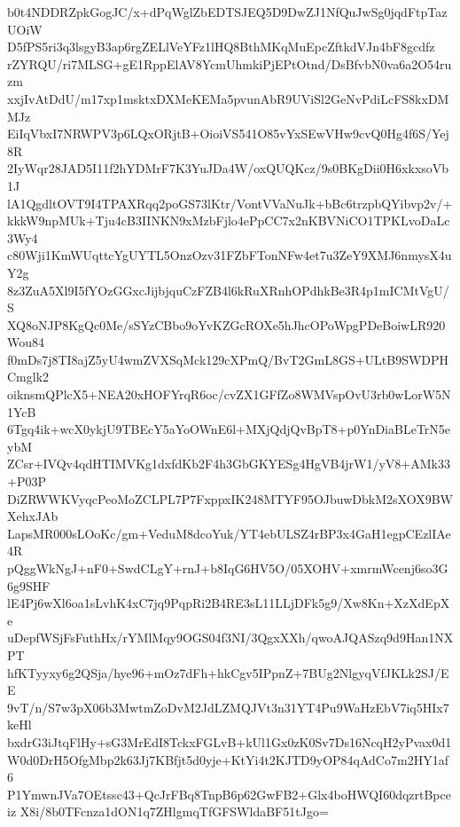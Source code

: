 b0t4NDDRZpkGogJC/x+dPqWglZbEDTSJEQ5D9DwZJ1NfQuJwSg0jqdFtpTazUOiW
D5fPS5ri3q3lsgyB3ap6rgZELlVeYFz1lHQ8BthMKqMuEpcZftkdVJn4bF8gcdfz
rZYRQU/ri7MLSG+gE1RppElAV8YcmUhmkiPjEPtOtnd/DsBfvbN0va6a2O54ruzm
xxjIvAtDdU/m17xp1msktxDXMeKEMa5pvunAbR9UViSl2GeNvPdiLcFS8kxDMMJz
EiIqVbxI7NRWPV3p6LQxORjtB+OioiVS541O85vYxSEwVHw9cvQ0Hg4f6S/Yej8R
2IyWqr28JAD5I11f2hYDMrF7K3YuJDa4W/oxQUQKcz/9s0BKgDii0H6xkxsoVb1J
lA1QgdltOVT9I4TPAXRqq2poGS73lKtr/VontVVaNuJk+bBc6trzpbQYibvp2v/+
kkkW9npMUk+Tju4cB3IINKN9xMzbFjlo4ePpCC7x2nKBVNiCO1TPKLvoDaLc3Wy4
c80Wji1KmWUqttcYgUYTL5OnzOzv31FZbFTonNFw4et7u3ZeY9XMJ6nmysX4uY2g
8z3ZuA5Xl9I5fYOzGGxcJijbjquCzFZB4l6kRuXRnhOPdhkBe3R4p1mICMtVgU/S
XQ8oNJP8KgQc0Me/sSYzCBbo9oYvKZGcROXe5hJhcOPoWpgPDeBoiwLR920Wou84
f0mDs7j8TI8ajZ5yU4wmZVXSqMck129cXPmQ/BvT2GmL8GS+ULtB9SWDPHCmglk2
oiknsmQPlcX5+NEA20xHOFYrqR6oc/cvZX1GFfZo8WMVspOvU3rb0wLorW5N1YcB
6Tgq4ik+wcX0ykjU9TBEcY5aYoOWnE6l+MXjQdjQvBpT8+p0YnDiaBLeTrN5eybM
ZCsr+IVQv4qdHTIMVKg1dxfdKb2F4h3GbGKYESg4HgVB4jrW1/yV8+AMk33+P03P
DiZRWWKVyqcPeoMoZCLPL7P7FxppxIK248MTYF95OJbuwDbkM2sXOX9BWXehxJAb
LapsMR000sLOoKc/gm+VeduM8dcoYuk/YT4ebULSZ4rBP3x4GaH1egpCEzlIAe4R
pQggWkNgJ+nF0+SwdCLgY+rnJ+b8IqG6HV5O/05XOHV+xmrmWcenj6so3G6g9SHF
lE4Pj6wXl6oa1sLvhK4xC7jq9PqpRi2B4RE3sL11LLjDFk5g9/Xw8Kn+XzXdEpXe
uDepfWSjFsFuthHx/rYMlMqy9OGS04f3NI/3QgxXXh/qwoAJQASzq9d9Han1NXPT
hfKTyyxy6g2QSja/hye96+mOz7dFh+hkCgv5IPpnZ+7BUg2NlgyqVfJKLk2SJ/EE
9vT/n/S7w3pX06b3MwtmZoDvM2JdLZMQJVt3n31YT4Pu9WaHzEbV7iq5HIx7keHl
bxdrG3iJtqFlHy+sG3MrEdI8TckxFGLvB+kUl1Gx0zK0Sv7Ds16NcqH2yPvax0d1
W0d0DrH5OfgMbp2k63Jj7KBfjt5d0yje+KtYi4t2KJTD9yOP84qAdCo7m2HY1af6
P1YmwnJVa7OEtssc43+QcJrFBq8TnpB6p62GwFB2+Glx4boHWQI60dqzrtBpceiz
X8i/8b0TFcnza1dON1q7ZHlgmqTfGFSWldaBF51tJgo=
